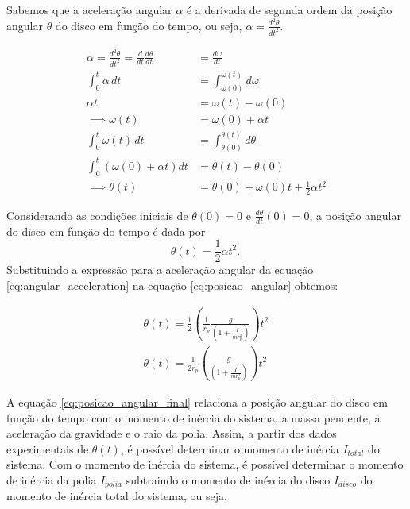 \documentclass[12pt,a4paper]{article}
\begin{document}
Sabemos que a aceleração angular $\alpha$ é a derivada de segunda ordem da posição angular $\theta$ do disco em função do tempo, ou seja, $\alpha = \frac{d^2\theta}{dt^2}$.

\begin{align}
    \alpha = \frac{d^2\theta}{dt^2} = \frac{d}{dt}\frac{d\theta}{dt} &= \frac{d\omega}{dt} \nonumber \\
    \int_0^t \alpha \, dt &= \int_{\omega(0)}^{\omega(t)} d\omega \nonumber \\
    \alpha t &= \omega(t) - \omega(0) \nonumber \\ 
    \implies \omega(t) &= \omega(0) + \alpha t \nonumber \\
    \int_0^t \omega(t) \, dt &= \int_{\theta(0)}^{\theta(t)} d\theta \nonumber\\
    \int_0^t \left(\omega(0) + \alpha t\right) dt &= \theta(t) - \theta(0) \nonumber \\
    \implies \theta(t) &= \theta(0) + \omega(0)t + \frac{1}{2}\alpha t^2 \nonumber
\end{align}

Considerando as condições iniciais de $\theta(0) = 0$ e $\frac{d\theta}{dt}(0) = 0$, a posição angular do disco em função do tempo é dada por
\begin{equation}
    \theta(t) = \frac{1}{2}\alpha t^2.~\label{eq:posicao_angular}
\end{equation}
Substituindo a expressão para a aceleração angular da equação \eqref{eq:angular_acceleration} na equação \eqref{eq:posicao_angular} obtemos:

\begin{align}
    \theta(t) = \frac{1}{2} \left(\frac{1}{r_p}\frac{g}{\left(1 + \frac{I}{mr_p^2}\right)}\right) t^2 \nonumber \\
    \theta(t) = \frac{1}{2r_p} \left(\frac{g}{\left(1 + \frac{I}{mr_p^2}\right)}\right) t^2 ~\label{eq:posicao_angular_final} 
\end{align}

A equação \eqref{eq:posicao_angular_final} relaciona a posição angular do disco em função do tempo com o momento de inércia do sistema, a massa pendente, a aceleração da gravidade e o raio da polia. Assim, a partir dos dados experimentais de $\theta(t)$, é possível determinar o momento de inércia $I_{total}$ do sistema. Com o momento de inércia do sistema, é possível determinar o momento de inércia da polia $I_{polia}$ subtraindo o momento de inércia do disco $I_{disco}$ do momento de inércia total do sistema, ou seja, 
\end{document}
